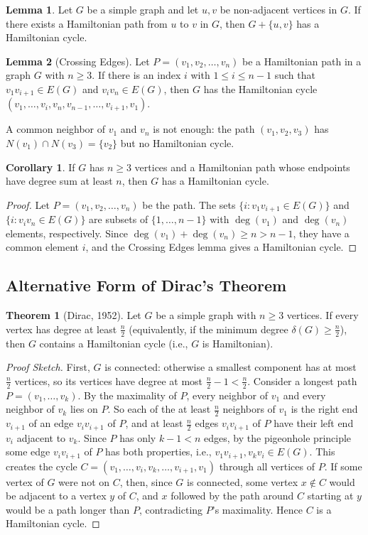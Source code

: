 \documentclass{article}
\theoremstyle{definition}
\newtheorem{theorem}{Theorem}
\newtheorem{lemma}{Lemma}
\newtheorem{corollary}{Corollary}
\begin{document}
\begin{lemma}
Let $G$ be a simple graph and let $u, v$ be non-adjacent vertices in $G$. If there exists a Hamiltonian path from $u$ to $v$ in $G$, then $G + \{u,v\}$ has a Hamiltonian cycle.
\end{lemma}
\begin{lemma}[Crossing Edges]
Let $P = (v_1, v_2, \ldots, v_n)$ be a Hamiltonian path in a graph $G$ with $n \geq 3$. If there is an index $i$ with $1 \leq i \leq n-1$ such that $v_1v_{i+1} \in E(G)$ and $v_iv_n \in E(G)$, then $G$ has the Hamiltonian cycle $(v_1, \ldots, v_i, v_n, v_{n-1}, \ldots, v_{i+1}, v_1)$.
\end{lemma}
A common neighbor of $v_1$ and $v_n$ is not enough: the path $(v_1, v_2, v_3)$ has $N(v_1) \cap N(v_3) = \{v_2\}$ but no Hamiltonian cycle.
\begin{corollary}
If $G$ has $n \geq 3$ vertices and a Hamiltonian path whose endpoints have degree sum at least $n$, then $G$ has a Hamiltonian cycle.
\end{corollary}
\begin{proof}
Let $P = (v_1, v_2, \ldots, v_n)$ be the path. The sets $\{i : v_1v_{i+1} \in E(G)\}$ and $\{i : v_iv_n \in E(G)\}$ are subsets of $\{1, \ldots, n-1\}$ with $\deg(v_1)$ and $\deg(v_n)$ elements, respectively. Since $\deg(v_1) + \deg(v_n) \geq n > n-1$, they have a common element $i$, and the Crossing Edges lemma gives a Hamiltonian cycle.
\end{proof}
\subsection{Alternative Form of Dirac's Theorem}
\begin{theorem}[Dirac, 1952]
Let $G$ be a simple graph with $n \geq 3$ vertices. If every vertex has degree at least $\frac{n}{2}$ (equivalently, if the minimum degree $\delta(G) \geq \frac{n}{2}$), then $G$ contains a Hamiltonian cycle (i.e., $G$ is Hamiltonian).
\end{theorem}
\begin{proof}[Proof Sketch]
First, $G$ is connected: otherwise a smallest component has at most $\frac{n}{2}$ vertices, so its vertices have degree at most $\frac{n}{2} - 1 < \frac{n}{2}$. Consider a longest path $P = (v_1, \ldots, v_k)$. By the maximality of $P$, every neighbor of $v_1$ and every neighbor of $v_k$ lies on $P$. So each of the at least $\frac{n}{2}$ neighbors of $v_1$ is the right end $v_{i+1}$ of an edge $v_iv_{i+1}$ of $P$, and at least $\frac{n}{2}$ edges $v_iv_{i+1}$ of $P$ have their left end $v_i$ adjacent to $v_k$. Since $P$ has only $k - 1 < n$ edges, by the pigeonhole principle some edge $v_iv_{i+1}$ of $P$ has both properties, i.e., $v_1v_{i+1}, v_kv_i \in E(G)$. This creates the cycle $C = (v_1, \ldots, v_i, v_k, \ldots, v_{i+1}, v_1)$ through all vertices of $P$. If some vertex of $G$ were not on $C$, then, since $G$ is connected, some vertex $x \notin C$ would be adjacent to a vertex $y$ of $C$, and $x$ followed by the path around $C$ starting at $y$ would be a path longer than $P$, contradicting $P$'s maximality. Hence $C$ is a Hamiltonian cycle.
\end{proof}
\end{document}
